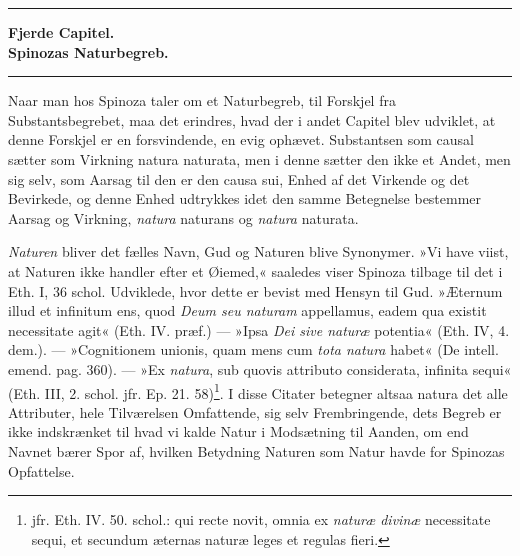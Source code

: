 \documentclass[12pt,a4paper]{book}
\newcommand{\opage}[1]{\marginnote{\footnotesize\textit{[#1]}}}
\begin{document}
\bigskip
\begin{center}\rule{2.5cm}{0.4pt}\end{center}
\bigskip

\begin{center}
{\large\textbf{Fjerde Capitel.}}\\[4pt]
\textbf{Spinozas Naturbegreb.}\\[6pt]
\rule{2cm}{0.4pt}
\end{center}
\bigskip

Naar man hos Spinoza taler om et Naturbegreb, til Forskjel fra
Substantsbegrebet, maa det erindres, hvad der i andet Capitel
blev udviklet, at denne Forskjel er en forsvindende, en evig
ophævet. Substantsen som causal sætter som Virkning natura
naturata, men i denne sætter den ikke et Andet, men sig selv, som
Aarsag til den er den causa sui, Enhed af det Virkende og det
Bevirkede, og denne Enhed udtrykkes idet den samme Betegnelse
bestemmer Aarsag og Virkning, \emph{natura} naturans og \emph{natura} naturata.

\opage{72} \setcounter{footnote}{0}%
\emph{Naturen} bliver det fælles Navn, Gud og Naturen blive Synonymer.
»Vi have viist, at Naturen ikke handler efter et Øiemed,«
saaledes viser Spinoza tilbage til det i Eth. I, 36 schol.
Udviklede, hvor dette er bevist med Hensyn til Gud. »Æternum
illud et infinitum ens, quod \emph{Deum seu naturam} appellamus, eadem
qua existit necessitate agit« (Eth. IV. præf.) --- »Ipsa \emph{Dei sive
naturæ} potentia« (Eth. IV, 4. dem.). --- »Cognitionem unionis,
quam mens cum \emph{tota natura} habet« (De intell. emend. pag. 360).
--- »Ex \emph{natura}, sub quovis attributo considerata, infinita
sequi« (Eth. III, 2. schol. jfr. Ep. 21. 58)\footnote{jfr. Eth.
IV. 50. schol.: qui recte novit, omnia ex \emph{naturæ divinæ}
necessitate sequi, et secundum æternas naturæ leges et regulas
fieri.}. I disse Citater betegner altsaa natura det alle
Attributer, hele Tilværelsen Omfattende, sig selv Frembringende,
dets Begreb er ikke indskrænket til hvad vi kalde Natur i
Modsætning til Aanden, om end Navnet bærer Spor af, hvilken
Betydning Naturen som Natur havde for Spinozas Opfattelse.
\end{document}
